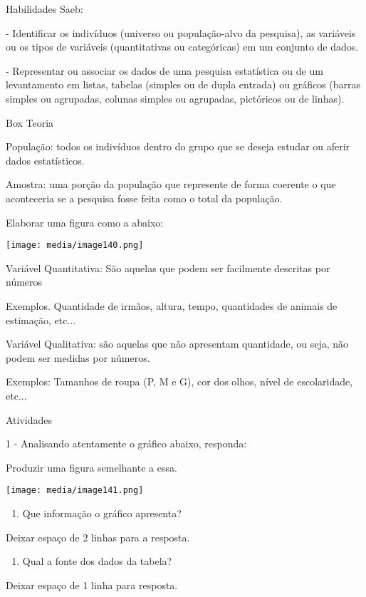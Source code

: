 Habilidades Saeb:

- Identificar os indivíduos (universo ou população-alvo da pesquisa), as
variáveis ou os tipos de variáveis (quantitativas ou categóricas) em um
conjunto de dados.

- Representar ou associar os dados de uma pesquisa estatística ou de um
levantamento em listas, tabelas (simples ou de dupla entrada) ou
gráficos (barras simples ou agrupadas, colunas simples ou agrupadas,
pictóricos ou de linhas).

Box Teoria

População: todos os indivíduos dentro do grupo que se deseja estudar ou
aferir dados estatísticos.

Amostra: uma porção da população que represente de forma coerente o que
aconteceria se a pesquisa fosse feita como o total da população.

Elaborar uma figura como a abaixo:

\texttt{[image: media/image140.png]}

Variável Quantitativa: São aquelas que podem ser facilmente descritas
por números

Exemplos. Quantidade de irmãos, altura, tempo, quantidades de animais de
estimação, etc...

Variável Qualitativa: são aquelas que não apresentam quantidade, ou
seja, não podem ser medidas por números.

Exemplos: Tamanhos de roupa (P, M e G), cor dos olhos, nível de
escolaridade, etc...

Atividades

1 - Analisando atentamente o gráfico abaixo, responda:

Produzir uma figura semelhante a essa.

\texttt{[image: media/image141.png]}

\begin{enumerate}
\def\labelenumi{\alph{enumi})}
\item
  Que informação o gráfico apresenta?
\end{enumerate}

Deixar espaço de 2 linhas para a resposta.

\begin{enumerate}
\def\labelenumi{\alph{enumi})}
\item
  Qual a fonte dos dados da tabela?
\end{enumerate}

Deixar espaço de 1 linha para resposta.

